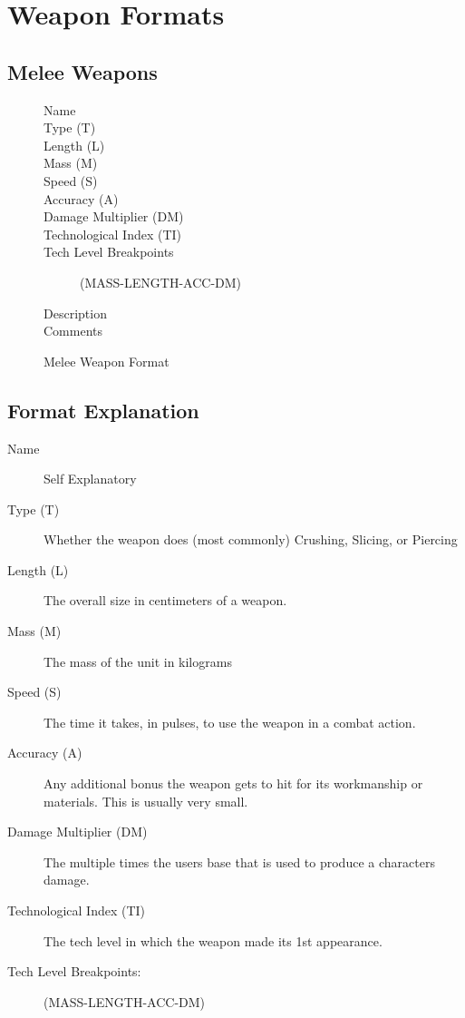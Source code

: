 \chapter{Weapon Formats}

\section{Melee Weapons}

\begin{figure}[hb]
\centering
\caption{Melee Weapon Format}
	\begin{description}
		\item[Name]
		\item[Type (T)]
		\item[Length (L)]
		\item[Mass (M)]
		\item[Speed (S)]
		\item[Accuracy (A)]
		\item[Damage Multiplier (DM)]
		\item[Technological Index (TI)]
		\item[Tech Level Breakpoints]
		(MASS-LENGTH-ACC-DM)
		\item[Description]
		\item[Comments]
	\end{description}
\end{figure}

\section{Format Explanation}

\begin{description}
	\item[Name]
	Self Explanatory
	\item[Type (T)]
	Whether the weapon does (most commonly) Crushing, Slicing, or Piercing
	\item[Length (L)]
	The overall size in centimeters of a weapon.
	\item[Mass (M)]
	The mass of the unit in kilograms
	\item[Speed (S)]
	The time it takes, in pulses, to use the weapon in a combat action.
	\item[Accuracy (A)]
	Any additional bonus the weapon gets to hit for its workmanship or
	materials. This is usually very small.
	\item[Damage Multiplier (DM)]
	The multiple times the users base that is used to produce a characters
	damage.
	\item[Technological Index (TI)]
	The tech level in which the weapon made its 1st appearance.
	\item[Tech Level Breakpoints:]
	(MASS-LENGTH-ACC-DM)
\end{description}

